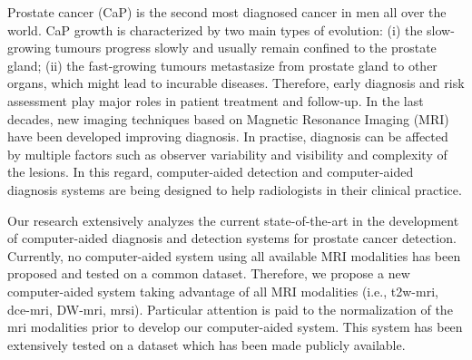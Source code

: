 


\begin{abstracts}        %
Prostate cancer (CaP) is the second most diagnosed cancer in men all over the world.
CaP growth is characterized by two main types of evolution: (i) the slow-growing tumours progress slowly and usually remain confined to the prostate gland; (ii) the fast-growing tumours metastasize from prostate gland to other organs, which might lead to incurable diseases.
Therefore, early diagnosis and risk assessment play major roles in patient treatment and follow-up.
In the last decades, new imaging techniques based on Magnetic Resonance Imaging (MRI) have been developed improving diagnosis.
In practise, diagnosis can be affected by multiple factors such as observer variability and visibility and complexity of the lesions.
In this regard, computer-aided detection and computer-aided diagnosis systems are being designed to help radiologists in their clinical practice.

Our research extensively analyzes the current state-of-the-art in the development of computer-aided diagnosis and detection systems for prostate cancer detection.
Currently, no computer-aided system using all available MRI modalities has been proposed and tested on a common dataset.
Therefore, we propose a new computer-aided system taking advantage of all MRI modalities (i.e., \acs*{t2w}-\acs*{mri}, \acs*{dce}-\acs*{mri}, DW-\acs*{mri}, \acs*{mrsi}).
Particular attention is paid to the normalization of the \acs*{mri} modalities prior to develop our computer-aided system.
This system has been extensively tested on a dataset which has been made publicly available.
\end{abstracts}

